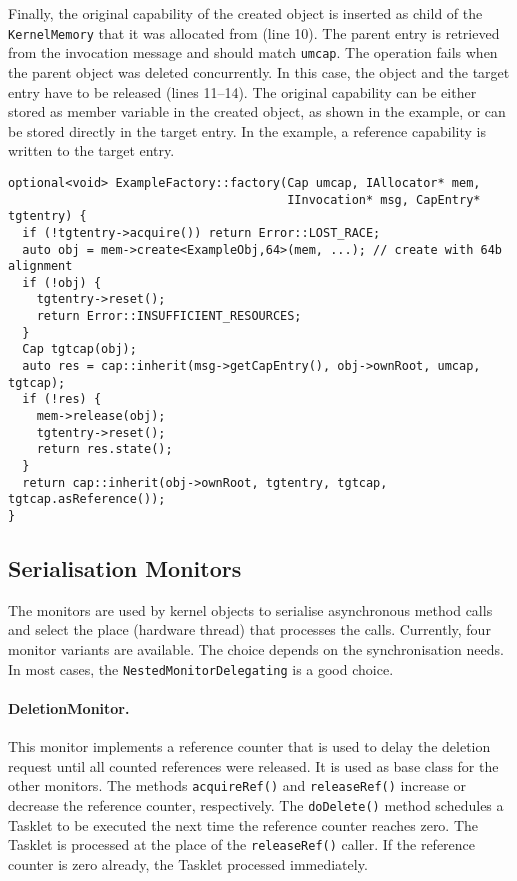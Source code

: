 Finally, the original capability of the created object is inserted as
child of the \texttt{KernelMemory} that it was allocated from (line
10).  The parent entry is retrieved from the invocation message and
should match \texttt{umcap}.  The operation fails when the parent
object was deleted concurrently.  In this case, the object and the
target entry have to be released (lines 11--14).  The original
capability can be either stored as member variable in the created
object, as shown in the example, or can be stored directly in the
target entry.  In the example, a reference capability is written to the
target entry.

\begin{lstlisting}[float, label=lst:factory, caption=An example factory implementation.]
optional<void> ExampleFactory::factory(Cap umcap, IAllocator* mem,
                                       IInvocation* msg, CapEntry* tgtentry) {
  if (!tgtentry->acquire()) return Error::LOST_RACE;
  auto obj = mem->create<ExampleObj,64>(mem, ...); // create with 64b alignment
  if (!obj) {
    tgtentry->reset();
    return Error::INSUFFICIENT_RESOURCES;
  }
  Cap tgtcap(obj);
  auto res = cap::inherit(msg->getCapEntry(), obj->ownRoot, umcap, tgtcap);
  if (!res) {
    mem->release(obj);
    tgtentry->reset();
    return res.state();
  }
  return cap::inherit(obj->ownRoot, tgtentry, tgtcap, tgtcap.asReference());
}
\end{lstlisting}



\subsection{Serialisation Monitors}

The monitors are used by kernel objects to serialise asynchronous
method calls and select the place (hardware thread) that processes the
calls.  Currently, four monitor variants are available.  The choice
depends on the synchronisation needs.  In most cases, the
\texttt{NestedMonitorDelegating} is a good choice.

\paragraph{DeletionMonitor.}
This monitor implements a reference counter that is used to delay the
deletion request until all counted references were released.  It is
used as base class for the other monitors.  The methods
\texttt{acquireRef()} and \texttt{releaseRef()} increase or decrease
the reference counter, respectively.  The \texttt{doDelete()} method
schedules a Tasklet to be executed the next time the reference counter
reaches zero.  The Tasklet is processed at the place of the
\texttt{releaseRef()} caller.  If the reference counter is zero
already, the Tasklet processed immediately.


